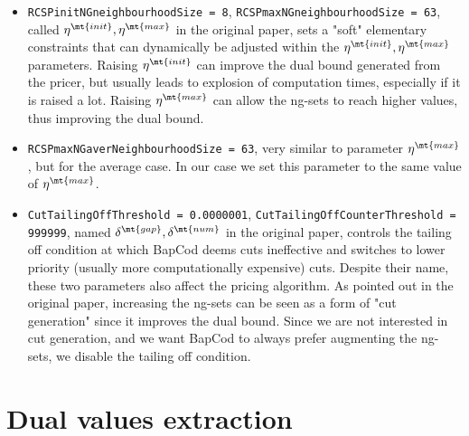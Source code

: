 \begin{itemize}
\begin{itemize}
		      \item \texttt{RCSPinitNGneighbourhoodSize = 8}, \texttt{RCSPmaxNGneighbourhoodSize = 63}, called $\eta^\mt{init}, \eta^\mt{max}$ in the original paper, sets a "soft" elementary constraints that can dynamically be adjusted within the $\eta^\mt{init}, \eta^\mt{max}$ parameters.
		            Raising $\eta^\mt{init}$ can improve the dual bound generated from the pricer, but usually leads to explosion of computation times, especially if it is raised a lot.
		            Raising $\eta^\mt{max}$ can allow the ng-sets to reach higher values, thus improving the dual bound.
		      \item \texttt{RCSPmaxNGaverNeighbourhoodSize = 63}, very similar to parameter $\eta^\mt{max}$, but for the average case.
		            In our case we set this parameter to the same value of $\eta^\mt{max}$.
		      \item \texttt{CutTailingOffThreshold = 0.0000001}, \texttt{CutTailingOffCounterThreshold = 999999}, named $\delta^\mt{gap}, \delta^\mt{num}$ in the original paper, controls the tailing off condition at which BapCod deems cuts ineffective and switches to lower priority (usually more computationally expensive) cuts.
		            Despite their name, these two parameters also affect the pricing algorithm.
		            As pointed out in the original paper, increasing the ng-sets can be seen as a form of "cut generation" since it improves the dual bound.
		            Since we are not interested in cut generation, and we want BapCod to always prefer augmenting the ng-sets, we disable the tailing off condition.
	      \end{itemize}
\end{itemize}


\section{Dual values extraction}

